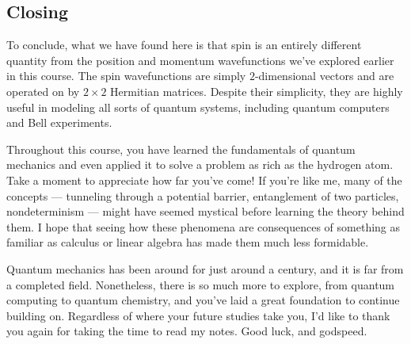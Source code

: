\subsection{Closing}

To conclude, what we have found here is that spin is an entirely different quantity from the position and momentum wavefunctions we've explored earlier in this course. The spin wavefunctions are simply $2$-dimensional vectors and are operated on by $2\times 2$ Hermitian matrices. Despite their simplicity, they are highly useful in modeling all sorts of quantum systems, including quantum computers and Bell experiments. 

Throughout this course, you have learned the fundamentals of quantum mechanics and even applied it to solve a problem as rich as the hydrogen atom. Take a moment to appreciate how far you've come! If you're like me, many of the concepts --- tunneling through a potential barrier, entanglement of two particles, nondeterminism --- might have seemed mystical before learning the theory behind them. I hope that seeing how these phenomena are consequences of something as familiar as calculus or linear algebra has made them much less formidable.

Quantum mechanics has been around for just around a century, and it is far from a completed field. Nonetheless, there is so much more to explore, from quantum computing to quantum chemistry, and you've laid a great foundation to continue building on. Regardless of where your future studies take you, I'd like to thank you again for taking the time to read my notes. Good luck, and godspeed.